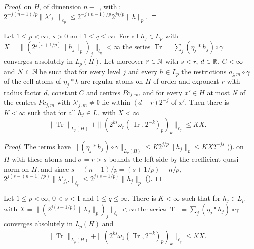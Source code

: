 \begin{proof}
\leanok
{} on $H$, of dimension $n - 1$, with :
$2^{-j(n-1)/p} \|\lambda'_{j,\cdot}\|_{\ell_p} \leq 2^{-j(n-1)/p} 2^{jn/p} \|h\|_p$.
\end{proof}

\begin{lemma}
\label{lem:trace-series-atoms}
\leanok
{}
Let $1 \leq p < \infty$, $s > 0$ and $1 \leq q \leq \infty$. For all $h_j \in L_p$ with
$X = \|(2^{j(s + 1/p)} \|h_j\|_p)_j\|_{\ell_q} < \infty$ the series
$\operatorname{Tr} = \sum_j (\eta_j * h_j) \circ \gamma$ converges absolutely in $L_p(H)$.
Let moreover $r \in \mathbb{N}$ with $s < r$, $d \in \mathbb{R}$, $C < \infty$ and $N \in \mathbb{N}$ be such that for every
level $j$ and every $h \in L_p$ the restrictions $a_{j,m} \circ \gamma$ of the cell atoms of
$\eta_j * h$ are regular atoms on $H$ of order and exponent $r$ with radius factor $d$, constant
$C$ and centres $P c_{j,m}$, and for every $x' \in H$ at most $N$ of the centres $P c_{j,m}$ with
$\lambda'_{j,m} \neq 0$ lie within $(d + r) 2^{-j}$ of $x'$. Then there is $K < \infty$ such that
for all $h_j \in L_p$ with $X < \infty$
\[
  \|\operatorname{Tr}\|_{L_p(H)} + \|(2^{ks} \omega_r(\operatorname{Tr}, 2^{-k})_p)_k\|_{\ell_q}
  \leq K X.
\]
\end{lemma}

\begin{proof}
\leanok
The terms have $\|(\eta_j * h_j) \circ \gamma\|_{L_p(H)} \leq K 2^{j/p} \|h_j\|_p \leq K X 2^{-js}$
().  on $H$ with these atoms and
$\sigma = r > s$ bounds the left side by the coefficient quasi-norm on $H$, and since
$s - (n - 1)/p = (s + 1/p) - n/p$,
$2^{j(s - (n-1)/p)} \|\lambda'_{j,\cdot}\|_{\ell_p} \leq 2^{j(s + 1/p)} \|h_j\|_p$
().
\end{proof}

\begin{theorem}
\label{thm:trace-series}
\leanok
{}
Let $1 \leq p < \infty$, $0 < s < 1$ and $1 \leq q \leq \infty$. There is $K < \infty$ such that for
$h_j \in L_p$ with $X = \|(2^{j(s + 1/p)} \|h_j\|_p)_j\|_{\ell_q} < \infty$ the series
$\operatorname{Tr} = \sum_j (\eta_j * h_j) \circ \gamma$ converges absolutely in $L_p(H)$ and
\[
  \|\operatorname{Tr}\|_{L_p(H)} + \|(2^{ks} \omega_1(\operatorname{Tr}, 2^{-k})_p)_k\|_{\ell_q}
  \leq K X.
\]
\end{theorem}

